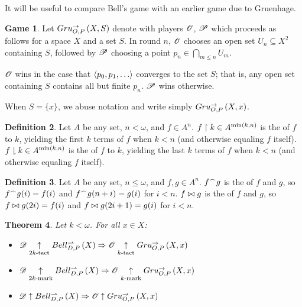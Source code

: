 \documentclass{amsart}
\newtheorem{theorem}{Theorem}[section]
\theoremstyle{definition}
\newtheorem{definition}[theorem]{Definition}
\newtheorem{game}[theorem]{Game}
\begin{document}
  It will be useful to compare Bell's game with an earlier game due to
  Gruenhage.

  \begin{game}
    Let \(Gru_{O,P}^{\to}\left({X},{S}\right)\) denote
     with
    players \(\mathscr{O}\), \(\mathscr{P}\) which proceeds as follows for a space
    \(X\) and a set \(S\). In round \(n\),
    \(\mathscr{O}\) chooses an open set \(U_n\subseteq X^2\) containing
    \(S\), followed by \(\mathscr{P}\)
    choosing a point \(p_n\in \bigcap_{m\leq n}U_m\).

    \(\mathscr{O}\) wins in the case that
    \(\<p_0,p_1,\dots\>\) converges to the set \(S\); that is,
    any open set containing \(S\) contains all but finite \(p_n\).
    \(\mathscr{P}\) wins otherwise.
  \end{game}

  When \(S=\{x\}\), we abuse notation and write simply
  \(Gru_{O,P}^{\to}\left({X},{x}\right)\).

  \begin{definition}
    Let \(A\) be any set, \(n<\omega\), and \(f\in A^n\).
    \(f\restriction k\in A^{\min(k,n)}\) is the  of \(f\)
    to \(k\), yielding the first \(k\) terms of
    \(f\) when \(k<n\) (and otherwise equaling \(f\) itself).
    \(f\downharpoonright k\in A^{\min(k,n)}\) is the  of \(f\)
    to \(k\), yielding the last \(k\) terms of
    \(f\) when \(k<n\) (and otherwise equaling \(f\) itself).
  \end{definition}

  \begin{definition}
    Let \(A\) be any set, \(n\leq\omega\), and \(f,g\in A^{n}\).
    \(f{^\frown} g\) is the  of \(f\) and \(g\), so
    \(f{^\frown} g(i)=f(i)\) and \(f{^\frown} g(n+i)=g(i)\) for \(i<n\).
    \(f\bowtie g\) is the  of \(f\) and \(g\), so
    \(f\bowtie g(2i)=f(i)\) and \(f\bowtie g(2i+1)=g(i)\) for \(i<n\).
  \end{definition}

  \begin{theorem}
    Let \(k<\omega\). For all \(x\in X\):
    \begin{itemize}
      \item
        \(
          \mathscr{D}\underset{2k\text{-tact}}{\uparrow} Bell_{D,P}^{\rightharpoonup}\left({X}\right)
            \Rightarrow
          \mathscr{O} \underset{k\text{-tact}}{\uparrow} Gru_{O,P}^{\to}\left({X},{x}\right)
        \)
      \item
        \(
          \mathscr{D}\underset{2k\text{-mark}}{\uparrow} Bell_{D,P}^{\rightharpoonup}\left({X}\right)
            \Rightarrow
          \mathscr{O} \underset{k\text{-mark}}{\uparrow} Gru_{O,P}^{\to}\left({X},{x}\right)
        \)
      \item
        \(
          \mathscr{D}\uparrow Bell_{D,P}^{\rightharpoonup}\left({X}\right)
            \Rightarrow
          \mathscr{O} \uparrow Gru_{O,P}^{\to}\left({X},{x}\right)
        \)
    \end{itemize}
  \end{theorem}
\end{document}
